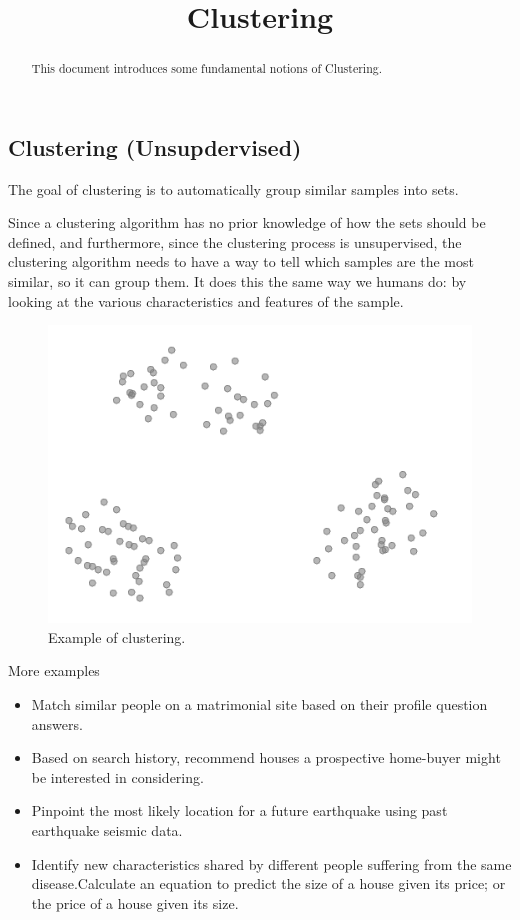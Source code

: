 \documentclass{article}
\begin{document}
\title{Clustering}

\maketitle

\begin{abstract}
This document introduces some fundamental notions of Clustering.
\end{abstract}

\subsection{Clustering (Unsupdervised)}
\par The goal of clustering is to automatically group similar samples into sets.

Since a clustering algorithm has no prior knowledge of how the sets should be defined, and furthermore, since the clustering process is unsupervised, the clustering algorithm needs to have a way to tell which samples are the most similar, so it can group them. It does this the same way we humans do: by looking at the various characteristics and features of the sample.

\begin{figure}[H]
\centering
\includegraphics[width=0.6\linewidth]{pic/clustering.png}
\caption{Example of clustering.}
\end{figure}

More examples

\begin{itemize}
    \item Match similar people on a matrimonial site based on their profile question answers.
    \item Based on search history, recommend houses a prospective home-buyer might be interested in considering.
    \item Pinpoint the most likely location for a future earthquake using past earthquake seismic data.
    \item Identify new characteristics shared by different people suffering from the same disease.Calculate an equation to predict the size of a house given its price; or the price of a house given its size.
\end{itemize}
\end{document}
